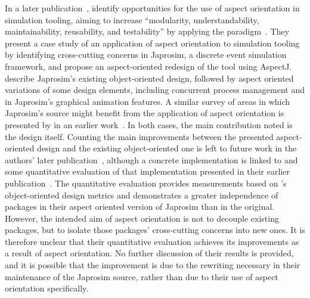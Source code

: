 In a later publication~\cite{chibani2019using}, \citeauthor{chibani2019using}
identify opportunities for the use of aspect orientation in simulation tooling,
aiming to increase ``modularity, understandability, maintainability,
reusability, and testability'' by applying the paradigm~\cite{chibani2019using}.
They present a case study of an application of aspect orientation to simulation
tooling by identifying cross-cutting concerns in Japrosim, a discrete event
simulation framework, and propose an aspect-oriented redesign of the tool using
AspectJ. \citeauthor{chibani2019using} describe Japrosim's existing
object-oriented design, followed by aspect oriented variations of some design
elements, including concurrent process management and in Japrosim's graphical
animation features. A similar survey of areas in which Japrosim's source might
benefit from the application of aspect orientation is presented by
\citeauthor{chibani2014practical} in an earlier
work~\cite{chibani2014practical}. In both cases, the main contribution noted is
the design itself. Counting the main improvements between the presented
aspect-oriented design and the existing object-oriented one is left to future
work in the authors' later publication~\cite{chibani2019using}, although a
concrete implementation is linked to and some quantitative evaluation of that
implementation presented in their earlier
publication~\cite{chibani2014practical}. The quantitative evaluation provides
measurements based on \citeauthor{martin1994oo}'s object-oriented design metrics
and demonstrates a greater independence of packages in their aspect oriented
version of Japrosim than in the original. However, the intended aim of aspect
orientation is not to decouple existing packages, but to isolate those packages'
cross-cutting concerns into new ones. It is therefore unclear that their
quantitative evaluation achieves its improvements as a result of aspect
orientation. No further discussion of their results is provided, and it is
possible that the improvement is due to the rewriting necessary in their
maintenance of the Japrosim source, rather than due to their use of aspect
orientation specifically.

